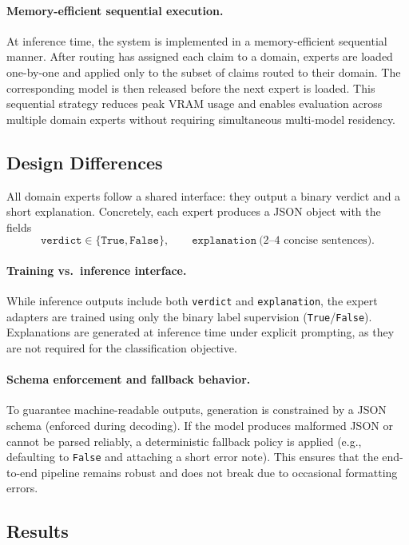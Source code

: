 \paragraph{Memory-efficient sequential execution.}
At inference time, the system is implemented in a memory-efficient sequential manner. After routing has assigned each claim to a domain, experts are loaded one-by-one and applied only to the subset of claims routed to their domain. The corresponding model is then released before the next expert is loaded. This sequential strategy reduces peak VRAM usage and enables evaluation across multiple domain experts without requiring simultaneous multi-model residency.

\subsection{Design Differences}
All domain experts follow a shared interface: they output a binary verdict and a short explanation. Concretely, each expert produces a JSON object with the fields
\[
\texttt{verdict} \in \{\texttt{True}, \texttt{False}\}, \qquad
\texttt{explanation} \ \text{(2--4 concise sentences)}.
\]

\paragraph{Training vs.\ inference interface.}
While inference outputs include both \texttt{verdict} and \texttt{explanation}, the expert adapters are trained using only the binary label supervision (\texttt{True}/\texttt{False}). Explanations are generated at inference time under explicit prompting, as they are not required for the classification objective.

\paragraph{Schema enforcement and fallback behavior.}
To guarantee machine-readable outputs, generation is constrained by a JSON schema (enforced during decoding). If the model produces malformed JSON or cannot be parsed reliably, a deterministic fallback policy is applied (e.g., defaulting to \texttt{False} and attaching a short error note). This ensures that the end-to-end pipeline remains robust and does not break due to occasional formatting errors.

\subsection{Results}

